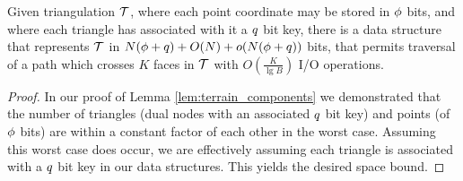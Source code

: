 \begin{theorem}\label{thm:terrain_keys_traversal}
Given triangulation $\mathcal{T}$, where each point coordinate may be stored 
in $\phi$ bits, and where each triangle has associated with it a 
$q$ bit key, there is a data structure that represents 
$\mathcal{T}$ in 
$N(\phi + q) + O(N) + o(N(\phi + q))$ bits, that 
permits traversal of a path which crosses $K$ faces in $\mathcal{T}$ 
with $O \left( \frac{K}{ \lg{B} } \right)$ I/O operations.
\end{theorem}

\begin{proof}
In our proof of Lemma \ref{lem:terrain_components} we demonstrated 
that the number of triangles (dual nodes with an associated $q$ 
bit key) and points (of $\phi$ bits) are within a constant factor 
of each other in the worst case. 
Assuming this worst case does occur, we are effectively assuming each 
triangle is associated with a $q$ bit key in our data structures. 
This yields the desired space bound.
\end{proof}

